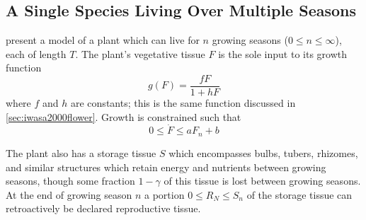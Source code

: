 \documentclass{article}
\begin{document}
\inputminted[firstline=8,lastline=60,frame=single,linenos]{julia}{src/Iwasa2000_shoot_root_balance.jl}















\subsection{A Single Species Living Over Multiple Seasons}
\label{sec:iwasa989-multi}

\citet{Iwasa1989} present a model of a plant which can live for $n$ growing seasons ($0\le n \le\infty$), each of length $T$. The plant's vegetative tissue $F$ is the sole input to its growth function
\begin{equation}
\label{equ:iwasa1989-g}
g(F)=\frac{fF}{1+hF}
\end{equation}
where $f$ and $h$ are constants; this is the same function discussed in \autoref{sec:iwasa2000flower}. Growth is constrained such that
\begin{equation}
0\le \dot{F}\le a F_n+b
\end{equation}

The plant also has a storage tissue $S$ which encompasses bulbs, tubers, rhizomes, and similar structures which retain energy and nutrients between growing seasons, though some fraction $1-\gamma$ of this tissue is lost between growing seasons. At the end of growing season $n$ a portion $0\le R_N \le S_n$ of the storage tissue can retroactively be declared reproductive tissue.
\end{document}
